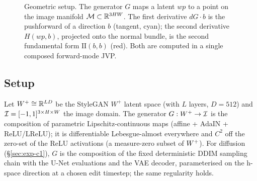 

\begin{figure}[t]
\centering
{}
\caption{Geometric setup. The generator $G$ maps a latent $wp$ to a
point on the image manifold $\mathcal{M} \subset \mathbb{R}^{3HW}$. The first
derivative $dG\!\cdot\!b$ is the pushforward of a direction $b$
(tangent, cyan); the second derivative $H(wp, b)$, projected onto the
normal bundle, is the second fundamental form $\mathrm{II}(b, b)$
(red). Both are computed in a single composed forward-mode JVP.}
\label{fig:geometric-setup}
\end{figure}

\subsection{Setup}
Let $W^+ \cong \mathbb{R}^{LD}$ be the StyleGAN $W^+$ latent space (with $L$
layers, $D = 512$) and $\mathcal{I} = [-1,1]^{3 \times H \times W}$ the image
domain. The generator $G : W^+ \to \mathcal{I}$ is the composition of
parametric Lipschitz-continuous maps (affine + AdaIN + ReLU/LReLU);
it is differentiable Lebesgue-almost everywhere and $C^2$ off the
zero-set of the ReLU activations (a measure-zero subset of $W^+$).
For diffusion (\S\ref{sec:exp-c1}), $G$ is the composition of the
fixed deterministic DDIM sampling chain with the U-Net evaluations
and the VAE decoder, parameterised on the h-space direction at a
chosen edit timestep; the same regularity holds.

